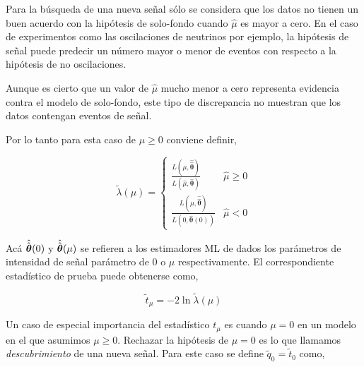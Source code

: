 
Para la búsqueda de una nueva señal sólo se considera que los datos no
tienen un buen acuerdo con la hipótesis de solo-fondo cuando $\hat{\mu}$
es mayor a cero.
En el caso de experimentos como las oscilaciones de neutrinos por ejemplo,
la hipótesis de señal puede predecir un número mayor o menor de
eventos con respecto a la hipótesis de no oscilaciones.

Aunque es cierto que un valor de $\hat{\mu}$ mucho menor a cero representa
evidencia contra el modelo de solo-fondo, este tipo de discrepancia no
muestran que los datos contengan eventos de señal.

Por lo tanto para esta caso de $\mu \geq 0$ conviene definir,

\begin{equation}
  \tilde{\lambda}(\mu) =
  \begin{cases}
    \frac{L(\mu, \hat{\hat{\bm{\theta}}})}{L(\hat{\mu}, \hat{\bm{\theta}})} &
    \hat{\mu} \geq 0 \\ \frac{L(\mu, \hat{\hat{\bm{\theta}}})}{L(0,
      \hat{\bm{\theta}}(0))} & \hat{\mu} < 0
  \end{cases}
\end{equation}

Acá $\hat{\hat{\bm{\theta}}}(0)$ y $\hat{\hat{\bm{\theta}}}(\mu)$ se refieren a los estimadores ML
de {\btheta} dados los parámetros de intensidad de señal parámetro de 0 o $\mu$
respectivamente. El correspondiente estadístico de prueba puede obtenerse como,

\begin{equation}
  \tilde{t}_\mu = -2 \ln \tilde{\lambda}(\mu)
\end{equation}

Un caso de especial importancia del estadístico $t_\mu$ es cuando $\mu=0$ en
un modelo en el que asumimos $\mu \geq 0$. Rechazar la hipótesis de $\mu=0$ es
lo que llamamos \emph{descubrimiento} de una nueva señal. Para este caso se
define $\tilde{q}_0=\tilde{t}_0$ como,

